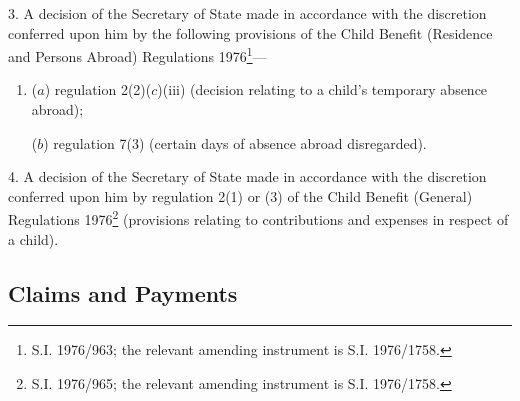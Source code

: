 \documentclass[12pt,a4paper]{article}
\begin{document}
3.  A decision of the Secretary of State made in accordance with the discretion conferred upon him by the following provisions of the Child Benefit (Residence and Persons Abroad) Regulations 1976\footnote{\frenchspacing S.I. 1976/963; the relevant amending instrument is S.I. 1976/1758.}—
\begin{enumerate}\item[]
($a$) regulation 2(2)($c$)(iii) (decision relating to a child’s temporary absence abroad);

($b$) regulation 7(3) (certain days of absence abroad disregarded).
\end{enumerate}

\medskip

4.  A decision of the Secretary of State made in accordance with the discretion conferred upon him by regulation 2(1) or (3) of the Child Benefit (General) Regulations 1976\footnote{\frenchspacing S.I. 1976/965; the relevant amending instrument is S.I. 1976/1758.} (provisions relating to contributions and expenses in respect of a child).

\subsection*{Claims and Payments}
\end{document}
